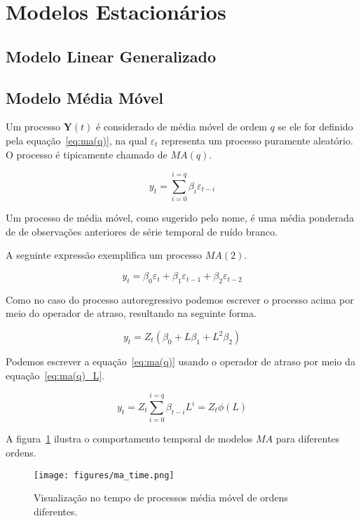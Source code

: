 \section{Modelos Estacionários}

\subsection{Modelo Linear Generalizado}
\label{sec:glm}

\subsection{Modelo Média Móvel}
\label{ssec:MA(p)}

Um processo $\mathbf{Y}(t)$ é considerado de média móvel de ordem $q$ se ele
for definido pela equação~\ref{eq:ma(q)}, na qual $\varepsilon_t$ representa um
processo puramente aleatório. O processo é tipicamente chamado de $MA(q)$.

\begin{equation}\label{eq:ma(q)}
    y_t = \sum_{i=0}^{i=q} \beta_i \varepsilon_{t-i}
\end{equation}

Um processo de média móvel, como sugerido pelo nome, é uma média ponderada de
de observações anteriores de série temporal de ruído branco.

A seguinte expressão exemplifica um processo $MA(2)$.

$$ y_t = \beta_0 \varepsilon_t + \beta_1 \varepsilon_{t-1} + \beta_2 \varepsilon_{t-2} $$

Como no caso do processo autoregressivo podemos escrever o processo acima por
meio do operador de atraso, resultando na seguinte forma.

$$ y_t = Z_t (\beta_0 + L\beta_1 + L^2\beta_2) $$

Podemos escrever a equação~\ref{eq:ma(q)} usando o operador de atraso por meio
da equação~\ref{eq:ma(q)_L}.

\begin{equation}\label{eq:ma(q)_L}
    y_t = Z_t \sum_{i=0}^{i=q} \beta_{t-i} L^{i} = Z_t \phi(L)
\end{equation}

A figura~\ref{fig:ma_time} ilustra o comportamento temporal de modelos $MA$ para
diferentes ordens.

\begin{figure}[H]
    \centering
    \texttt{[image: figures/ma\_time.png]}
    \caption{Visualização no tempo de processos média móvel de ordens
    diferentes.}
    \label{fig:ma_time}
\end{figure}

